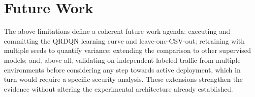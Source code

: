 \section{Future Work}
The above limitations define a coherent future work agenda: executing and committing the QRDQN learning curve and leave-one-CSV-out; retraining with multiple seeds to quantify variance; extending the comparison to other supervised models; and, above all, validating on independent labeled traffic from multiple environments before considering any step towards active deployment, which in turn would require a specific security analysis. These extensions strengthen the evidence without altering the experimental architecture already established.
